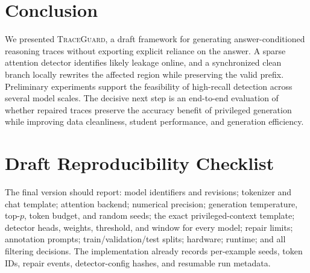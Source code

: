 \documentclass[11pt]{article}
\newcommand{\method}{\textsc{TraceGuard}\xspace}
\begin{document}
\section{Conclusion}

We presented \method, a draft framework for generating answer-conditioned
reasoning traces without exporting explicit reliance on the answer.  A sparse
attention detector identifies likely leakage online, and a synchronized clean
branch locally rewrites the affected region while preserving the valid prefix.
Preliminary experiments support the feasibility of high-recall detection across
several model scales.  The decisive next step is an end-to-end evaluation of
whether repaired traces preserve the accuracy benefit of privileged generation
while improving data cleanliness, student performance, and generation
efficiency.



\appendix

\section{Draft Reproducibility Checklist}

The final version should report: model identifiers and revisions; tokenizer and
chat template; attention backend; numerical precision; generation temperature,
top-$p$, token budget, and random seeds; the exact privileged-context template;
detector heads, weights, threshold, and window for every model; repair limits;
annotation prompts; train/validation/test splits; hardware; runtime; and all
filtering decisions.  The implementation already records per-example seeds,
token IDs, repair events, detector-config hashes, and resumable run metadata.
\end{document}

